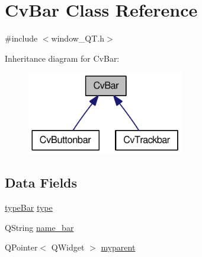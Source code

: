 \hypertarget{classCvBar}{
\section{CvBar Class Reference}
\label{classCvBar}
}


{\ttfamily \#include $<$window\_\-QT.h$>$}



Inheritance diagram for CvBar:\nopagebreak
\begin{figure}[H]
\begin{center}
\leavevmode
\includegraphics[width=194pt]{classCvBar__inherit__graph}
\end{center}
\end{figure}
\subsection*{Data Fields}
\begin{DoxyCompactItemize}
\item 
\hyperlink{window__QT_8h_a4003d2816fd898b0f71eb5addfe80af3}{typeBar} \hyperlink{classCvBar_a64329aa3255c2c98a36f3f887a939b40}{type}
\item 
QString \hyperlink{classCvBar_a6970f0eae76786143e2df415681d0a6f}{name\_\-bar}
\item 
QPointer$<$ QWidget $>$ \hyperlink{classCvBar_af6fa35b8c9f4aed557854fc3aa80a040}{myparent}
\end{DoxyCompactItemize}



